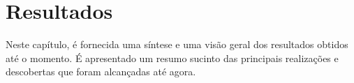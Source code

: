 \section{Resultados} \label{sec:result}

Neste capítulo, é fornecida uma síntese e uma visão geral dos resultados obtidos até o momento. É apresentado um resumo sucinto das principais realizações e descobertas que foram alcançadas até agora.






















  

 